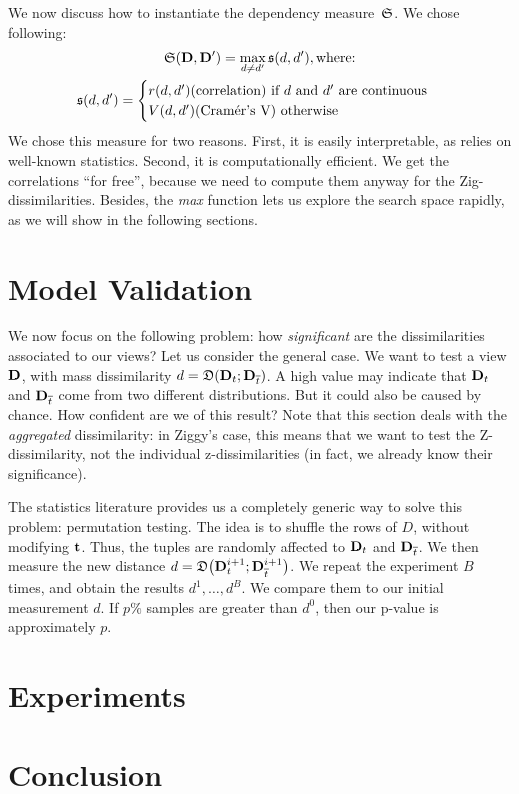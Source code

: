 We now discuss how to instantiate the dependency measure~$\mathfrak{S}$. We chose
following:
\begin{gather}
    \mathfrak{S}(\mathbf{D}, \mathbf{D'}) = \max_{d \neq d'} \mathfrak{s}(d, d'), \text{where:}\\
         \mathfrak{s}(d, d')= \begin{cases}
             r(d, d') \text{(correlation) if $d$ and $d'$ are continuous}\\
             V(d, d') \text{(Cram\'er's V) otherwise}
         \end{cases}
\end{gather}
We chose this measure for two reasons. First, it is easily interpretable, as
relies on well-known statistics. Second, it is computationally efficient.
We get the correlations ``for free'', because we need to compute them
anyway for the Zig-dissimilarities. Besides, the \emph{max} function lets us
explore the search space rapidly, as we will show in the following sections.


\section{Model Validation}
\label{sec:validation}

We now focus on the following problem: how \emph{significant} are the
dissimilarities associated to our views? Let us consider the general
case. We want to test a view $\mathbf{D}$, with mass dissimilarity $d = \mathfrak{D}(
\mathbf{D}_t  ; \mathbf{D}_{\overline{t}})$. A high value may indicate that  $\mathbf{D}_t$
and $\mathbf{D}_{\overline{t}}$ come from two different distributions. But it could
also be caused by chance. How confident are we of this result? Note that this
section deals with the \emph{aggregated} dissimilarity: in Ziggy's case, this
means that we want to test the Z-dissimilarity, not the individual
z-dissimilarities (in fact, we already know their significance).

The statistics literature provides us a completely generic way to solve this
problem: permutation testing. The idea is to shuffle the rows of $D$, without
modifying $\mathbf{t}$. Thus, the tuples are randomly affected to $\mathbf{D}_t$ and
$\mathbf{D}_{\overline{t}}$. We then measure the new distance $d=\mathfrak{D}\big(
\mathbf{D}^{i+1}_t  ; \mathbf{D}^{i+1}_{\overline{t}} \big)$. We repeat the experiment
$B$ times, and obtain the results $d^1, \ldots, d^B$. We compare them to our
initial measurement $d$. If $p\%$ samples are greater than $d^0$, then our
p-value is approximately $p$.



\section{Experiments}
\label{sec:experiments}

\section{Conclusion}
\label{sec:conclusions}
